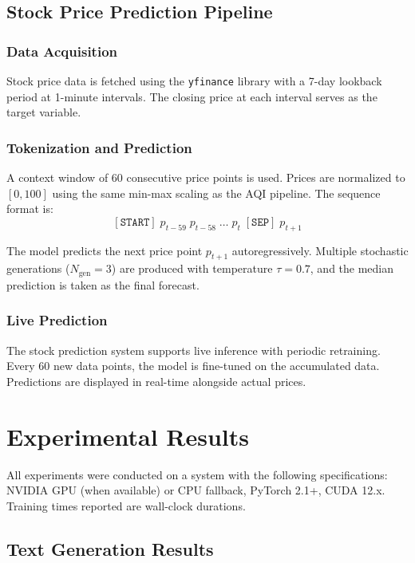 \documentclass[conference]{IEEEtran}
\begin{document}
\subsection{Stock Price Prediction Pipeline}

\subsubsection{Data Acquisition}

Stock price data is fetched using the \texttt{yfinance} library with a 7-day lookback period at 1-minute intervals. The closing price at each interval serves as the target variable.

\subsubsection{Tokenization and Prediction}

A context window of 60 consecutive price points is used. Prices are normalized to $[0, 100]$ using the same min-max scaling as the AQI pipeline. The sequence format is:
\[
[\texttt{START}]\; p_{t-59}\; p_{t-58}\; \dots\; p_t\; [\texttt{SEP}]\; p_{t+1}
\]

The model predicts the next price point $p_{t+1}$ autoregressively. Multiple stochastic generations ($N_{\text{gen}} = 3$) are produced with temperature $\tau = 0.7$, and the median prediction is taken as the final forecast.

\subsubsection{Live Prediction}

The stock prediction system supports live inference with periodic retraining. Every 60 new data points, the model is fine-tuned on the accumulated data. Predictions are displayed in real-time alongside actual prices.

\FloatBarrier
\section{Experimental Results}
\label{sec:results}

All experiments were conducted on a system with the following specifications: NVIDIA GPU (when available) or CPU fallback, PyTorch 2.1+, CUDA 12.x. Training times reported are wall-clock durations.

\subsection{Text Generation Results}
\end{document}
